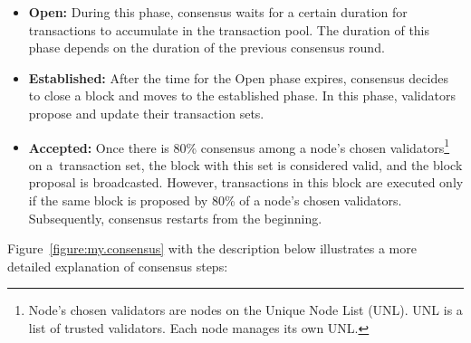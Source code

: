 \begin{itemize}
    \item \textbf{Open:} During this phase, consensus waits for a certain duration for transactions to accumulate in the transaction pool. The duration of this phase depends on the duration of the previous consensus round.
    \item \textbf{Established:} After the time for the Open phase expires, consensus decides to close a block and moves to the established phase. In this phase, validators propose and update their transaction sets.
    \item \textbf{Accepted:} Once there is 80\% consensus among a node's chosen validators\footnote{Node's chosen validators are nodes on the Unique Node List (UNL). UNL is a list of trusted validators. Each node manages its own UNL.} on a~transaction set, the block with this set is considered valid, and the block proposal is broadcasted. However, transactions in this block are executed only if the same block is proposed by 80\% of a node's chosen validators. Subsequently, consensus restarts from the beginning.
\end{itemize}

Figure~\ref{figure:my.consensus} with the description below illustrates a more detailed explanation of consensus steps:

